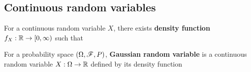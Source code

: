 \documentclass[letterpaper,10pt,english]{article}
\begin{document}
%

\subsection{Continuous random variables}
\begin{defn}
For a continuous random variable $X$, 
there exists \textbf{density function} $f_X: \mathbb{R} \to [0, \infty)$ such that 
\end{defn}
\begin{shaded}
\begin{exmp}
For a probability space $(\Omega, \mathscr{F}, P)$, \textbf{Gaussian random variable} is a continuous random variable $X: \Omega \to \mathbb{R}$ defined by its density function 
\end{exmp}
\end{shaded}
\end{document}
